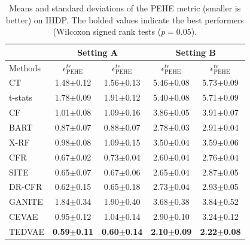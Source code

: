 \documentclass[letterpaper]{article} %
\begin{document}
\begin{table}[!t]
	\centering
	\setlength{\tabcolsep}{3pt}
	\begin{tabular}{l | c c | c c }
		\hline
		& \multicolumn{2}{c|}{Setting A} & \multicolumn{2}{c}{Setting B}\\
		\hline
		Methods & $\epsilon_{\text{PEHE}}^{tr}$ & $\epsilon_{\text{PEHE}}^{te}$ & $\epsilon_{\text{PEHE}}^{tr}$ & $\epsilon_{\text{PEHE}}^{te}$ \\
		\hline
		CT &  1.48$\pm$0.12 & 1.56$\pm$0.13 & 5.46$\pm$0.08 & 5.73$\pm$0.09\\
		t-stats &  1.78$\pm$0.09 & 1.91$\pm$0.12 & 5.40$\pm$0.08 & 5.71$\pm$0.09\\
		\hline
		CF	& 1.01$\pm$0.08 & 1.09$\pm$0.16 & 3.86$\pm$0.05 & 3.91$\pm$0.07\\
		BART & 0.87$\pm$0.07 & 0.88$\pm$0.07 & 2.78$\pm$0.03 & 2.91$\pm$0.04\\
		X-RF & 0.98$\pm$0.08 & 1.09$\pm$0.15 & 3.50$\pm$0.04 & 3.59$\pm$0.06  \\
		\hline
		CFR	 & 0.67$\pm$0.02 & 0.73$\pm$0.04 & 2.60$\pm$0.04 & 2.76$\pm$0.04 \\

		SITE & 0.65$\pm$0.07 & 0.67$\pm$0.06 & 2.65$\pm$0.04 & 2.87$\pm$0.05 \\
		DR-CFR  & 0.62$\pm$0.15 & 0.65$\pm$0.18 & 2.73$\pm$0.04 & 2.93$\pm$0.05\\
		\hline
		GANITE & 1.84$\pm$0.34 & 1.90$\pm$0.40 & 3.68$\pm$0.38 & 3.84$\pm$0.52\\
		CEVAE & 0.95$\pm$0.12 & 1.04$\pm$0.14 & 2.90$\pm$0.10 & 3.24$\pm$0.12\\
		TEDVAE & \textbf{0.59$\pm$0.11} & \textbf{0.60$\pm$0.14} & \textbf{2.10$\pm$0.09} & \textbf{2.22$\pm$0.08} \\
		\hline
	\end{tabular}
	\caption{Means and standard deviations of the PEHE metric (smaller is better) on IHDP. The bolded values indicate the best performers (Wilcoxon signed rank tests ($p=0.05$).}
	\label{IHDP}
\end{table}
\end{document}
